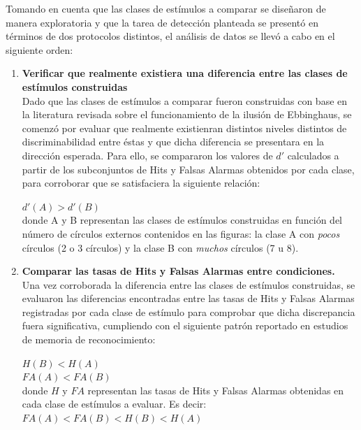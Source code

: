 Tomando en cuenta que las clases de estímulos a comparar se diseñaron de manera exploratoria y que la tarea de detección planteada se presentó en términos de dos protocolos distintos, el análisis de datos se llevó a cabo en el siguiente orden:\\

\begin{enumerate}
\item \textbf{Verificar que realmente existiera una diferencia entre las clases de estímulos construidas}\\

Dado que las clases de estímulos a comparar fueron construidas con base en la literatura revisada sobre el funcionamiento de la ilusión de Ebbinghaus, se comenzó por evaluar que realmente existienran distintos niveles distintos de discriminabilidad entre éstas y que dicha diferencia se presentara en la dirección esperada. Para ello, se compararon los valores de $d'$ calculados a partir de los subconjuntos de Hits y Falsas Alarmas obtenidos por cada clase, para corroborar que se satisfaciera la siguiente relación:\\

\begin{center}
 $d'(A) > d'(B)$\\
 donde A y B representan las clases de estímulos construidas en función del número de círculos externos contenidos en las figuras: la clase A con \textit{pocos} círculos (2 o 3 círculos) y la clase B con \textit{muchos} círculos (7 u 8).\\
\end{center}

\item \textbf{Comparar las tasas de Hits y Falsas Alarmas entre condiciones.}\\

Una vez corroborada la diferencia entre las clases de estímulos construidas, se evaluaron las diferencias encontradas entre las tasas de Hits y Falsas Alarmas registradas por cada clase de estímulo para comprobar que dicha discrepancia fuera significativa, cumpliendo con el siguiente patrón reportado en estudios de memoria de reconocimiento:\\

\begin{center}
$H(B) < H(A)$\\
$FA(A) < FA(B)$\\
donde $H$ y $FA$ representan las tasas de Hits y Falsas Alarmas obtenidas en cada clase de estímulos a evaluar. Es decir:\\
$FA(A) < FA(B) < H(B) < H(A)$\\
\end{center}


\end{enumerate}
